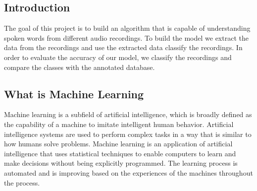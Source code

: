 \documentclass[english,12pt,oneside,a4paper]{article}
\begin{document}
\begin{center}
		\section{Introduction}
		The goal of this project is to build an algorithm that is capable of understanding spoken words from different audio recordings. To build the model we extract the data from the recordings and use the extracted data classify the recordings. In order to evaluate the  accuracy of our model, we classify the recordings and compare the classes with the annotated database. 
		\subsection{What is Machine Learning}
		Machine learning is a subfield of artificial intelligence, which is broadly defined as the capability of a machine to imitate intelligent human behavior. Artificial intelligence systems are used to perform complex tasks in a way that is similar to how humans solve problems.
		Machine learning is an application of artificial intelligence that uses statistical techniques to enable computers to learn and make decisions without being explicitly programmed. The learning process is automated and is improving based on the experiences of the machines throughout the process.

\end{center}
\end{document}
